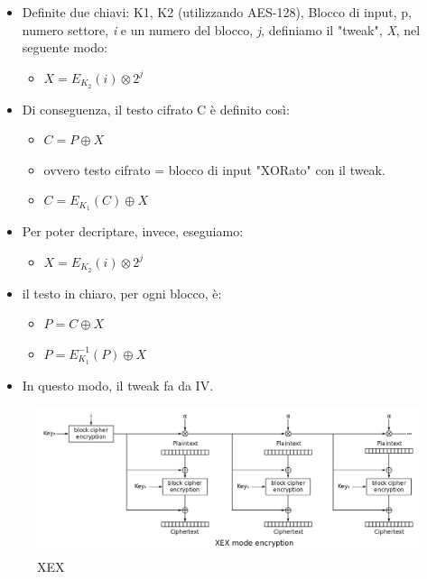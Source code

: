 \begin{itemize}
	\item \textsf{\small Definite due chiavi: K1, K2 (utilizzando AES-128), Blocco di input, p, numero settore, \emph{i} e un numero del blocco, \emph{j}, definiamo il "tweak", \emph{X}, nel seguente modo:}
	\begin{itemize}
		\item \textsf{\small $X = E_{K_2}(i) \otimes 2^j$}
	\end{itemize}
	\item \textsf{\small Di conseguenza, il testo cifrato C è definito così:}
	\begin{itemize}
		\item \textsf{\small $C = P \oplus X$}
		\item \textsf{\small ovvero testo cifrato = blocco di input "XORato" con il tweak.}
		\item \textsf{\small $C = E_{K_1}(C) \oplus X$}
	\end{itemize}
	\item \textsf{\small Per poter decriptare, invece, eseguiamo: }
	\begin{itemize}
		\item \textsf{\small $X = E_{K_2} (i) \otimes 2^j$}
	\end{itemize}
	\item \textsf{\small il testo in chiaro, per ogni blocco, è:}
	\begin{itemize}
		\item \textsf{\small $P = C \oplus X$}
		\item \textsf{\small $P = E^{-1}_{K_1} (P) \oplus X$}
	\end{itemize}
	\item \textsf{\small In questo modo, il tweak fa da IV.}
\end{itemize}

\textsf{\small }

\begin{figure}[H]
	\centering
	\includegraphics[width=1\textwidth, height=1\textheight, keepaspectratio]{./images/aes_modes/xex.png}
	\caption{XEX}
	\label{fig:xex}
\end{figure}

